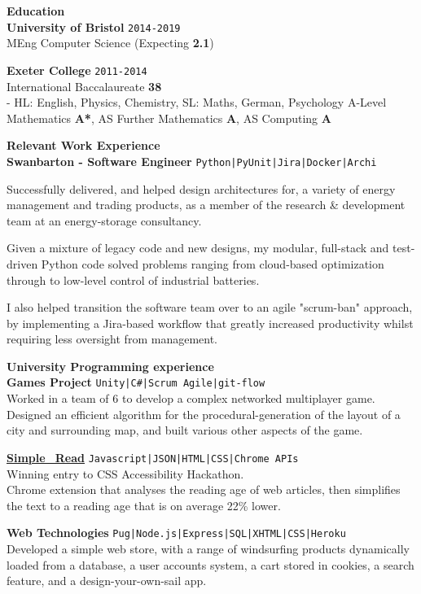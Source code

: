 \documentclass[10pt]{article}
\newcommand{\bold}[1]{\textbf{\textcolor{dark}{#1}}}
\newcommand{\sect}[1]{
\vspace{0.4em} {\LARGE\bold{#1}}\vspace{0.2em}\\}
\newcommand{\zz}[3]{
{\large\bold{#1}} \hfill 
{\small \colorbox{light}{\texttt{#3}}}\\
{#2}\vspace{0.6em}}
\newcommand{\li}{\textcolor{mid}{|}}
\begin{document}
\begin{minipage}[t]{0.65\textwidth}
\raggedright

\vspace{-1.2em}
\sect{Education}
\zz{University of Bristol}
{MEng Computer Science \small{(Expecting \bold{2.1})}}{2014-2019}

\zz{Exeter College}
{International Baccalaureate \bold{38} \\  
\hspace{1em} {\small - HL: English, Physics, Chemistry, SL: Maths, German, Psychology}
\vspace{0.2em}
A-Level Mathematics \bold{A*}, AS Further Mathematics \bold{A}, AS Computing \bold{A}}
{2011-2014}



\sect{Relevant Work Experience}

\zz{Swanbarton - Software Engineer}
{Successfully delivered, and helped design architectures for, a variety of energy management and trading products, as a member of the research \& development team at an energy-storage consultancy.

Given a mixture of legacy code and new designs, my modular, full-stack and test-driven Python code solved problems ranging from cloud-based optimization through to low-level control of industrial batteries.

I also helped transition the software team over to an agile "scrum-ban" approach, by implementing a Jira-based workflow that greatly increased productivity whilst requiring less oversight from management.}
{Python\li PyUnit\li Jira\li Docker\li Archi}




\sect{University Programming experience}

\zz{Games Project}
{Worked in a team of 6 to develop a complex networked multiplayer game.\\
Designed an efficient algorithm for the procedural-generation of the layout of a city and surrounding map, and built various other aspects of the game.}
{Unity\li C\#\li Scrum Agile\li git-flow}

\zz{\href{https://lukestorry.co.uk/simple_read/}{Simple\_Read}}
{Winning entry to CSS Accessibility Hackathon.\\
Chrome extension that analyses the reading age of web articles, then simplifies the text to a reading age that is on average 22\% lower.}{Javascript\li JSON\li HTML\li CSS\li Chrome APIs}

\zz{Web Technologies}
{Developed a simple web store, with a range of windsurfing products dynamically loaded from a database, a  user accounts system, a cart stored in cookies, a search feature, and a design-your-own-sail app.}
{Pug\li Node.js\li Express\li SQL\li XHTML\li CSS\li Heroku}


\end{minipage}
\end{document}

